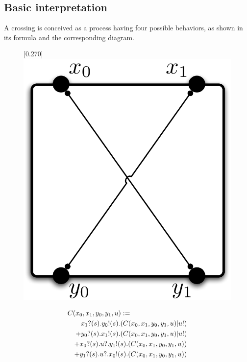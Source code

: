 \documentclass[12pt]{amsart}
\begin{document}
\subsection{Basic interpretation}\label{sub:basic_interpretation} %
A crossing is conceived as a process having four possible behaviors, as shown in its formula and the corresponding diagram.
  \begin{figure}[tbp]
    \centering
    \scalebox{0.27}[0.270]{\includegraphics[viewport=0 0 390 360]{BasicCrossingCircuit.pdf}}
\end{figure}
\begin{eqnarray}
  \lefteqn{ C(x_0,x_1,y_0,y_1,u) := } \nonumber \\
  & & x_1?(s).y_0!(s).(C(x_0,x_1,y_0,y_1,u)|u!) \nonumber \\
  & & + y_0?(s).x_1!(s).(C(x_0,x_1,y_0,y_1,u)|u!) \nonumber \\
  & & + x_0?(s).u?.y_1!(s).(C(x_0,x_1,y_0,y_1,u)) \nonumber \\
  & & + y_1?(s).u?.x_0!(s).(C(x_0,x_1,y_0,y_1,u)) \nonumber
\end{eqnarray}
\end{document}

